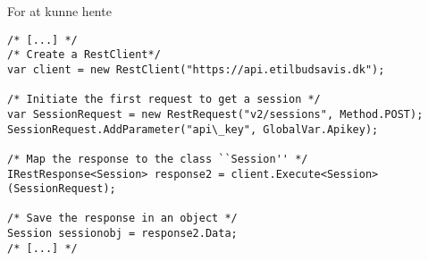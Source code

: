 For at kunne hente 
\begin{lstlisting}
/* [...] */
/* Create a RestClient*/
var client = new RestClient("https://api.etilbudsavis.dk");

/* Initiate the first request to get a session */
var SessionRequest = new RestRequest("v2/sessions", Method.POST);
SessionRequest.AddParameter("api\_key", GlobalVar.Apikey);

/* Map the response to the class ``Session'' */
IRestResponse<Session> response2 = client.Execute<Session>(SessionRequest);

/* Save the response in an object */
Session sessionobj = response2.Data;
/* [...] */
\end{lstlisting}
